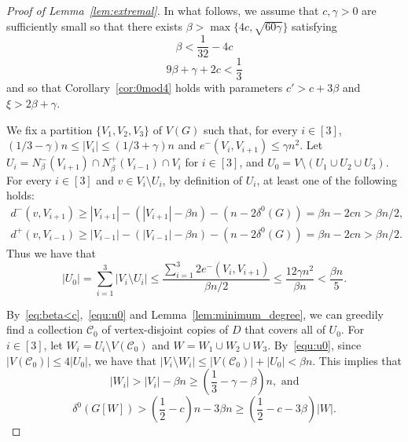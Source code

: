 \documentclass[10pt,a4paper]{amsart}
\newcommand{\C}{\mathcal{C}}
\begin{document}
\begin{proof}[Proof of Lemma~\ref{lem:extremal}]
    In what follows, we assume that $c, \gamma >0$ are sufficiently small so that there exists $\beta > \max\{ 4c, \sqrt{60\gamma} \}$ satisfying   
    \begin{equation}\label{eq:beta<c}
        \beta < \frac{1}{32}-4c
    \end{equation}
    \begin{equation}\label{eq:bgc<1/3}
        9\beta + \gamma + 2c < \frac{1}{3}
    \end{equation}
    and so that Corollary~\ref{cor:0mod4} holds with parameters $c' > c+3\beta$ and $\xi > 2\beta +\gamma $. 
    
    We fix a partition $\{V_1,V_2,V_3\}$ of $V(G)$ such that, for every $i\in[3]$, $(1/3 - \gamma)n \le |V_i| \le (1/3 + \gamma)n$ and $e^-(V_i,V_{i+1})\le \gamma n^2$.
    Let $U_i=N^-_\beta(V_{i+1})\cap N^+_\beta(V_{i-1}) \cap V_i$ for $i\in [3]$, and $U_0=V\setminus(U_1\cup U_2\cup U_3)$.
    For every $i\in[3]$ and $v\in V_i\setminus U_i$, by definition of $U_i$, at least one of the following holds:
    \begin{align*}
        d^-(v,V_{i+1})\ge |V_{i+1}|-(|V_{i+1}|-\beta n)-(n-2\delta^0(G))=\beta n-2cn > \beta n/2,\\
        d^+(v,V_{i-1})\ge |V_{i-1}|-(|V_{i-1}|-\beta n)-(n-2\delta^0(G))=\beta n-2cn > \beta n/2.
    \end{align*}
    Thus we have that
    \begin{equation}
        |U_0|=\sum_{i=1}^3|V_i\setminus U_i|\le \frac{\sum_{i=1}^3 2e^-(V_i,V_{i+1})}{\beta n/2}\le \frac{12\gamma n^2}{\beta n} < \frac{\beta n}{5}.\label{equ:u0}
    \end{equation}

    By~\eqref{eq:beta<c},~\eqref{equ:u0} and Lemma~\ref{lem:minimum_degree}, we can greedily find a collection $\C_0$ of vertex-disjoint copies of $D$ that covers all of $U_0$.
    For $i\in[3]$, let $W_i=U_i\setminus V(\C_0)$ and $W=W_1\cup W_2\cup W_3$.
    By~\eqref{equ:u0}, since $|V(\C_0)|\le 4|U_0|$, we have that $|V_i\setminus W_i|\le |V(\C_0)| + |U_0| < \beta n$. This implies that
    \begin{equation} \label{eq:|Wi|}
        |W_i| > |V_i| - \beta n \ge \left(\frac{1}{3} - \gamma - \beta \right) n, \text{ and}
    \end{equation}
    \begin{equation} \label{eq:deg_Wi}
        \delta^0(G[W]) > \left( \frac{1}{2} -c \right)n - 3\beta n \ge 
        \left( \frac{1}{2} -c - 3\beta \right) |W|.
    \end{equation}


\end{proof}
\end{document}
